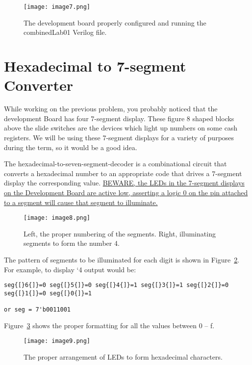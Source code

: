 \begin{figure}[ht]
\caption{The development board properly configured and running the
combinedLab01 Verilog file.}
\texttt{[image: image7.png]}
\label{fig:combinedBoard}
\end{figure}

\hypertarget{part-2-hexadecimal-to-7-segment-converter}{%
\section{Hexadecimal to 7-segment Converter}\label{part-2-hexadecimal-to-7-segment-converter}}

While working on the previous problem, you probably noticed that the
development Board has four 7-segment display. These figure 8 shaped
blocks above the slide switches are the devices which light up numbers
on some cash registers. We will be using these 7-segment displays for a
variety of purposes during the term, so it would be a good idea.

The hexadecimal-to-seven-segment-decoder is a combinational circuit that
converts a hexadecimal number to an appropriate code that drives a
7-segment display the corresponding value. \uline{BEWARE, the LEDs in
the 7-segment displays on the Development Board are active low,
asserting a logic 0 on the pin attached to a segment will cause that
segment to illuminate.}

\begin{figure}[ht]
\texttt{[image: image8.png]}
\caption{Left, the proper numbering of the segments. Right,
illuminating segments to form the number 4.}
\label{fig:sevenSeg}
\end{figure}

The pattern of segments to be illuminated for each digit is shown in
Figure~\ref{fig:sevenSeg}. For example, to display `4 output would be:

\begin{verbatim}
seg{[}6{]}=0 seg{[}5{]}=0 seg{[}4{]}=1 seg{[}3{]}=1 seg{[}2{]}=0
seg{[}1{]}=0 seg{[}0{]}=1

or seg = 7'b0011001
\end{verbatim}

Figure~\ref{fig:sevenSegChars} shows the proper formatting for all the values between 0 -- f.

\begin{figure}[ht]
\texttt{[image: image9.png]}
\caption{The proper arrangement of LEDs to form hexadecimal characters.}
\label{fig:sevenSegChars}
\end{figure}

